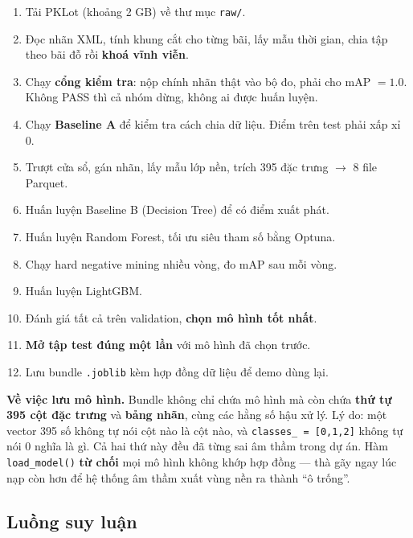 \documentclass[12pt]{ai_conquer2026}
\begin{document}
\begin{enumerate}
\item Tải PKLot (khoảng 2 GB) về thư mục \texttt{raw/}.
\item Đọc nhãn XML, tính khung cắt cho từng bãi, lấy mẫu thời gian, chia tập theo bãi đỗ rồi \textbf{khoá vĩnh viễn}.
\item Chạy \textbf{cổng kiểm tra}: nộp chính nhãn thật vào bộ đo, phải cho mAP $= 1.0$. Không PASS thì cả nhóm dừng, không ai được huấn luyện.
\item Chạy \textbf{Baseline A} để kiểm tra cách chia dữ liệu. Điểm trên test phải xấp xỉ 0.
\item Trượt cửa sổ, gán nhãn, lấy mẫu lớp nền, trích 395 đặc trưng $\rightarrow$ 8 file Parquet.
\item Huấn luyện Baseline B (Decision Tree) để có điểm xuất phát.
\item Huấn luyện Random Forest, tối ưu siêu tham số bằng Optuna.
\item Chạy hard negative mining nhiều vòng, đo mAP sau mỗi vòng.
\item Huấn luyện LightGBM.
\item Đánh giá tất cả trên validation, \textbf{chọn mô hình tốt nhất}.
\item \textbf{Mở tập test đúng một lần} với mô hình đã chọn trước.
\item Lưu bundle \texttt{.joblib} kèm hợp đồng dữ liệu để demo dùng lại.
\end{enumerate}

\textbf{Về việc lưu mô hình.} Bundle không chỉ chứa mô hình mà còn chứa \textbf{thứ tự 395 cột đặc trưng} và \textbf{bảng nhãn}, cùng các hằng số hậu xử lý. Lý do: một vector 395 số không tự nói cột nào là cột nào, và \texttt{classes\_ = [0,1,2]} không tự nói 0 nghĩa là gì. Cả hai thứ này đều đã từng sai âm thầm trong dự án. Hàm \texttt{load\_model()} \textbf{từ chối} mọi mô hình không khớp hợp đồng --- thà gãy ngay lúc nạp còn hơn để hệ thống âm thầm xuất vùng nền ra thành ``ô trống''.

\subsection{Luồng suy luận}
\end{document}
